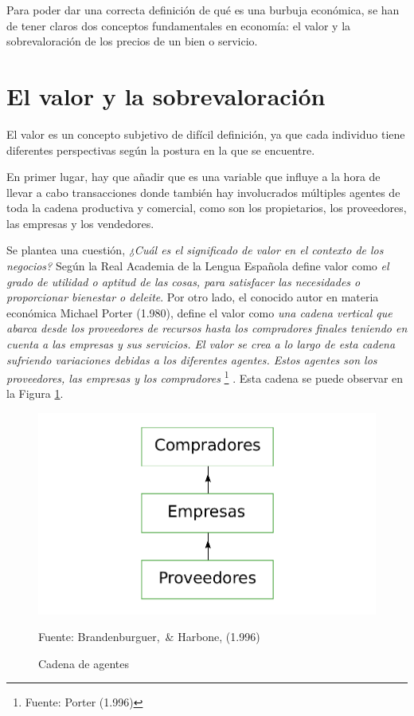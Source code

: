 Para poder dar una correcta definición de qué es una burbuja económica, se han de tener claros dos conceptos fundamentales en economía: el valor y la sobrevaloración de los precios de un bien o servicio. 
\section{El valor y la sobrevaloración} 
El valor es un concepto subjetivo de difícil definición, ya que cada individuo tiene diferentes perspectivas según la postura en la que se encuentre. 

En primer lugar, hay que añadir que es una variable que influye a la hora de llevar a cabo transacciones donde también hay involucrados múltiples agentes de toda la cadena productiva y comercial, como son los propietarios, los proveedores, las empresas y los vendedores. 

Se plantea una cuestión, \emph{¿Cuál es el significado de valor en el contexto de los negocios?} Según la Real Academia de la Lengua Española define valor como \emph{el grado de utilidad o aptitud de las cosas, para satisfacer las necesidades o  proporcionar bienestar o deleite}. Por otro lado, el conocido autor en materia económica Michael Porter (1.980), define el valor como \emph{una cadena vertical que abarca desde los proveedores de recursos hasta los compradores finales teniendo en cuenta a las empresas y sus servicios. El valor se crea a lo largo de esta cadena sufriendo variaciones debidas a los diferentes agentes. Estos agentes son los proveedores, las empresas y los compradores}	\footnote{Fuente: Porter (1.996)} . Esta cadena se puede observar en la Figura \ref{fig:Cadena de agentes}.

\begin{figure}[!h]
	\caption{Cadena de agentes}
	\centering \includegraphics[width=150mm]{capitulos/graficos/cadenaAgentes} 
	\label{fig:Cadena de agentes} 
	
		\footnotesize
		Fuente: Brandenburguer, \& Harbone, (1.996)


\end{figure}

